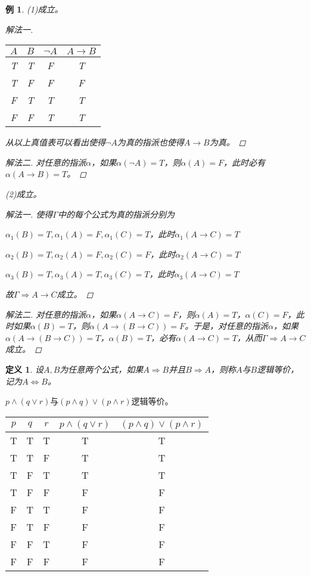 \documentclass{article}
\newtheorem{Def}{定义}
\newtheorem*{Example}{例}
\begin{document}
\begin{CJK}{UTF8}{gbsn}
\begin{Example}
    (1)成立。
    \begin{proof}[解法一]$\quad$

    \begin{tabular}{cc|cc}
      $A$& $B$&$\lnot A$&$A\to B$\\
      \hline
      T&T&F&T\\
      T&F&F&F\\
      F&T&T&T\\
      F&F&T&T\\      
    \end{tabular}

    从以上真值表可以看出使得$\lnot A$为真的指派也使得$A\to B$为真。
  \end{proof}

  \begin{proof}[解法二]
    对任意的指派$\alpha$，如果$\alpha(\lnot A)=T$，则$\alpha(A)=F$，此时必有$\alpha(A\to B)=T$。
  \end{proof}
   
    (2)成立。
  \begin{proof}[解法一]
    使得$\Gamma$中的每个公式为真的指派分别为

    $\alpha_1(B)=T, \alpha_1(A)=F, \alpha_1(C)=T$，此时$\alpha_1(A\to C)=T$

    $\alpha_2(B)=T, \alpha_2(A)=F, \alpha_2(C)=F$，此时$\alpha_2(A\to C)=T$

    $\alpha_3(B)=T, \alpha_3(A)=T, \alpha_3(C)=T$，此时$\alpha_3(A\to C)=T$

    故$\Gamma \Rightarrow A\to C$成立。
  \end{proof}
\begin{proof}[解法二]
    对任意的指派$\alpha$，如果$\alpha(A\to C)=F$，则$\alpha(A)=T$，$\alpha(C)=F$，此时如果$\alpha(B)=T$，则$\alpha(A\to(B\to C))=F$。于是，对任意的指派$\alpha$，如果$\alpha(A\to(B\to C))=T$，$\alpha(B)=T$，必有$\alpha(A\to C)=T$，从而$\Gamma\Rightarrow A\to C$成立。
\end{proof}   

\end{Example}
\begin{Def}
  设$A,B$为任意两个公式，如果$A\Rightarrow B$并且$B\Rightarrow A$，则称$A$与$B$逻辑等价，记为$A\Leftrightarrow B$。
\end{Def}

  
$p\land (q\lor r)$与$(p\land q)\lor (p \land r)$逻辑等价。

    \begin{tabular}{ccc|cc}
    $p$& $q$& $r$& $p\land (q\lor r)$&$(p\land q)\lor (p \land r)$\\
    \hline
   T& T&T&T&T\\
    T&T&F&T&T\\
    T&F&T&T&T\\
     T& F&F&F&F\\
    F&T&T&F&F\\
    F&T&F&F&F\\
   F& F&T&F&F\\
    F&  F&F&F&F\\      
  \end{tabular}


\end{CJK}
\end{document}
